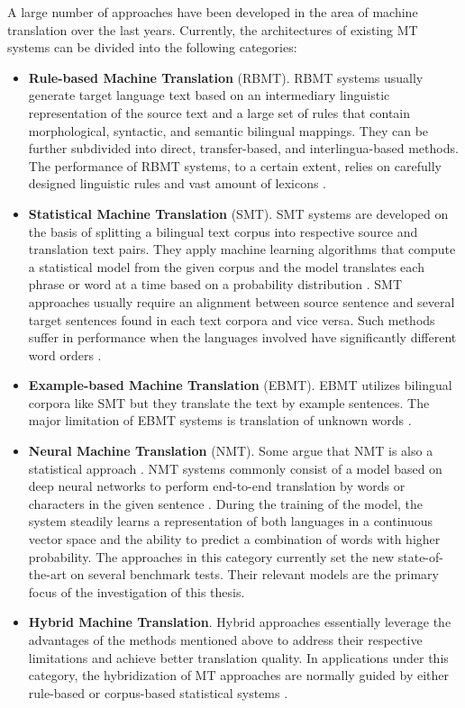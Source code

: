 A large number of approaches have been developed in the area of machine translation over the last years. Currently, the architectures of existing MT systems can be divided into the following categories: 
\medskip  
\begin{itemize}
\item \textbf{Rule-based Machine Translation} (RBMT). RBMT systems usually generate target language text based on an intermediary linguistic representation of the source text and a large set of rules that contain morphological, syntactic, and semantic bilingual mappings. They can be further subdivided into direct, transfer-based, and interlingua-based methods. The performance of RBMT systems, to a certain extent, relies on carefully designed linguistic rules and vast amount of lexicons \cite{Moussallem2017}.
\item \textbf{Statistical Machine Translation} (SMT). SMT systems are developed on the basis of splitting a bilingual text corpus into respective source and translation text pairs. They apply machine learning algorithms that compute a statistical model from the given corpus and the model translates each phrase or word at a time based on a probability distribution \cite{Moussallem2017}. SMT approaches usually require an alignment between source sentence and several target sentences found in each text corpora and vice versa. Such methods suffer in performance when the languages involved have significantly different word orders \cite{okpor2014machine}.
\item \textbf{Example-based Machine Translation} (EBMT). EBMT utilizes bilingual corpora like SMT but they translate the text by example sentences. The major limitation of EBMT systems is translation of unknown words \cite{Moussallem2017}. 
\item \textbf{Neural Machine Translation} (NMT). Some argue that NMT is also a statistical approach \cite{Moussallem2017}. NMT systems commonly consist of a model based on deep neural networks to perform end-to-end translation by words or characters in the given sentence \cite{Moussallem2017}. During the training of the model, the system steadily learns a representation of both languages in a continuous vector space and the ability to predict a combination of words with higher probability. The approaches in this category currently set the new state-of-the-art on several benchmark tests. Their relevant models are the primary focus of the investigation of this thesis.
\item \textbf{Hybrid Machine Translation}. Hybrid approaches essentially leverage the advantages of the methods mentioned above to address their respective limitations and achieve better translation quality. In applications under this category, the hybridization of MT approaches are normally guided by either rule-based or corpus-based statistical systems \cite{costa2015latest}.
\end{itemize}

